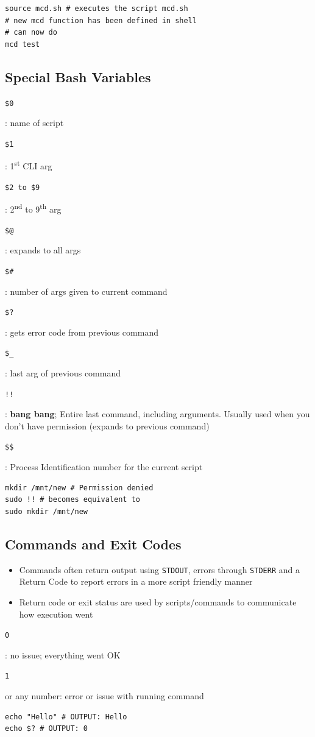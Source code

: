 \documentclass[letterpaper,12pt]{article}
\newcommand*{\lstitem}[1]{
  \setbox0\hbox{\lstinline{#1}}
  \item[\usebox0]
}
\begin{document}
\begin{lstlisting}
source mcd.sh # executes the script mcd.sh
# new mcd function has been defined in shell
# can now do
mcd test
\end{lstlisting}

\subsection{Special Bash Variables}
\begin{description}
 \lstitem{$0}: name of script
 \lstitem{$1}: 1\textsuperscript{st} CLI arg
 \lstitem{$2 to $9}: 2\textsuperscript{nd} to 9\textsuperscript{th} arg
 \lstitem{$@}: expands to all args
 \lstitem{$#}: number of args given to current command
 \lstitem{$?}: gets error code from previous command
 \lstitem{$_}: last arg of previous command
 \lstitem{!!}: \textbf{bang bang}; Entire last command, including arguments. Usually used when you don't have permission (expands to previous command)
 \lstitem{$$}: Process Identification number for the current script
\end{description}

\begin{lstlisting}
mkdir /mnt/new # Permission denied
sudo !! # becomes equivalent to
sudo mkdir /mnt/new
\end{lstlisting}

\subsection{Commands and Exit Codes}

\begin{itemize}
 \item Commands often return output using \lstinline{STDOUT}, errors through \lstinline{STDERR} and a Return Code to report errors in a more script friendly manner
 \item Return code or exit status are used by scripts/commands to communicate how execution went
\end{itemize}

\begin{description}
 \lstitem{0}: no issue; everything went OK
 \lstitem{1} or any number: error or issue with running command
\end{description}

\begin{lstlisting}
echo "Hello" # OUTPUT: Hello
echo $? # OUTPUT: 0
\end{lstlisting}
\end{document}
